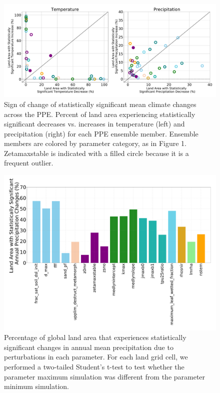 \documentclass[draft,grl]{agutexSI2019}
\begin{document}
\begin{figure}[htb!]
\noindent\includegraphics[width=\textwidth]{writing/figs/Figure_S9_Percentage_Significant_Sign_Change.pdf}
\caption{Sign of change of statistically significant mean climate changes across the PPE. Percent of land area experiencing statistically significant decreases vs. increases in temperature (left) and precipitation (right) for each PPE ensemble member. Ensemble members are colored by parameter category, as in Figure 1. Zetamaxstable is indicated with a filled circle because it is a frequent outlier.}
\label{fig:supp_pct_stat_sig}
\end{figure}

\begin{figure}[htb!]
\noindent\includegraphics[width=\textwidth]{writing/figs/Figure_S_Precip_Change_Significance_by_Parameter.pdf}
\caption{Percentage of global land area that experiences statistically significant changes in annual mean precipitation due to perturbations in each parameter. For each land grid cell, we performed a two-tailed Student’s t-test to test whether the parameter maximum simulation was different from the parameter minimum simulation.}
\label{fig:supp_precip_significance_changes}
\end{figure}
\end{document}

